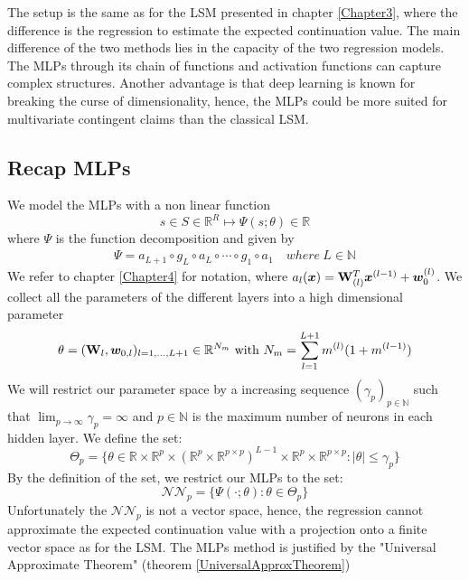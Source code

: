 The setup is the same as for the LSM presented in chapter \ref{Chapter3}, where the difference is the regression to estimate the expected continuation value. The main difference of the two methods lies in the capacity of the two regression models. The MLPs through its chain of functions and activation functions can capture complex structures. Another advantage is that deep learning is known for breaking the curse of dimensionality, hence, the MLPs could be more suited for multivariate contingent claims than the classical LSM.

\subsection{Recap MLPs}
We model the MLPs with a non linear function 
$$s \in S \in \mathbb{R}^R \mapsto \Psi(s;\theta) \in \mathbb{R}$$
where $\Psi$ is the function decomposition and given by
\begin{align*}
\Psi = a_{L+1} \circ g_L \circ a_{L} \circ \cdots \circ g_1 \circ a_1 \quad where \ L\in \mathbb{N}
\end{align*}
We refer to chapter \ref{Chapter4} for notation, where $a_l(\bm{x})=\mathbf{W}_{(l)}^T \bm{x}^{(l-1)} + \bm{w}_{0}^{(l)}$. We collect all the parameters of the different layers into a high dimensional parameter
$$\theta=(\mathbf{W}_l, \bm{w}_{0,l})_{l=1,\ldots,L+1} \in \mathbb{R}^{N_m} \text{ with } N_m=\sum_{l=1}^{L+1} m^{(l)} (1+ m^{(l-1)})$$
We will restrict our parameter space by a increasing sequence $(\gamma_p)_{p\in \mathbb{N}}$ such that $\lim_{p\to \infty} \gamma_p=\infty$ and $p\in \mathbb{N}$ is the maximum number of neurons in each hidden layer. We define the set:
$$\Theta_p = \{ \theta \in \mathbb{R} \times \mathbb{R}^p \times (\mathbb{R}^p \times \mathbb{R}^{p \times p})^{L-1} \times \mathbb{R}^{p} \times \mathbb{R}^{p \times p} : |\theta| \leq \gamma_p \}$$
By the definition of the set, we restrict our MLPs to the set:
$$\mathcal{N} \mathcal{N}_p= \{ \Psi(\cdot;\theta) : \theta \in \Theta_p \}$$
Unfortunately the $\mathcal{N} \mathcal{N}_p$ is not a vector space, hence, the regression cannot approximate the expected continuation value with a projection onto a finite vector space as for the LSM. The MLPs method is justified by the "Universal Approximate Theorem" (theorem \ref{UniversalApproxTheorem})

